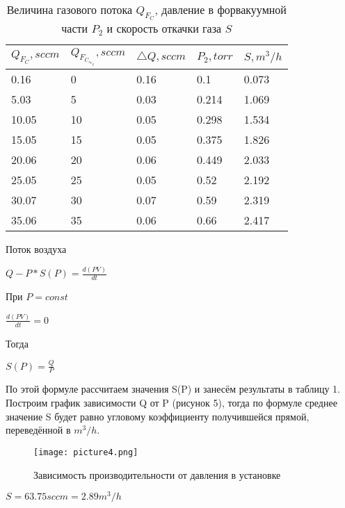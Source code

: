 \documentclass[a4paper]{article}
\begin{document}
\begin{table}[h]
    \centering
    \begin{center}
    \caption{Величина газового потока $Q_F_C$, давление в форвакуумной части $P_2$ и скорость откачки газа $S$}
        \label{tab:my_label}
    \end{center}
   \begin{tabular}{ |p{2.5cm}|p{3cm}|p{2.3cm}|p{2cm}|p{2cm}|  }
 \hline
 $Q_F_C, sccm$ & $Q_F_C_s_e_t, sccm$ & $\triangle Q, sccm$ & $P_2, torr$ & $S, m^3/h$   \\
\hline

 0.16 & 0 & 0.16 & 0.1 & 0.073 \\
 5.03 & 5 & 0.03 & 0.214 & 1.069  \\
 10.05 & 10 & 0.05 & 0.298 & 1.534 \\
 15.05 & 15 & 0.05 & 0.375 & 1.826\\
 20.06 & 20 & 0.06 & 0.449 & 2.033 \\
 25.05 & 25 & 0.05 & 0.52 & 2.192 \\
 30.07 & 30 & 0.07 & 0.59 & 2.319\\
 35.06 & 35 & 0.06 & 0.66 & 2.417 \\
 \hline
\end{tabular}

\end{table}
\newpage
Поток воздуха 
\begin{center}
$Q-P*S(P)=\frac{d(PV)}{dt}$
\end{center}
При $P = const$
\begin{center}
$\frac{d(PV)}{dt}=0$
\end{center}
Тогда
\begin{center}
$S(P)=\frac{Q}{P}$
\end{center}

По этой формуле рассчитаем значения S(P) и занесём результаты в таблицу 1. Построим график зависимости Q от P (рисунок 5), тогда по формуле среднее значение S будет равно угловому коэффициенту получившейся прямой, переведённой в $m^3/h$. 

\begin{figure}[h]
    \centering
    \texttt{[image: picture4.png]}
    \caption{Зависимость производительности от давления в установке}
    \label{fig:vac}
\end{figure}

\begin{center}
$S = 63.75 sccm = 2.89 m^3/h$
\end{center}
\end{document}
